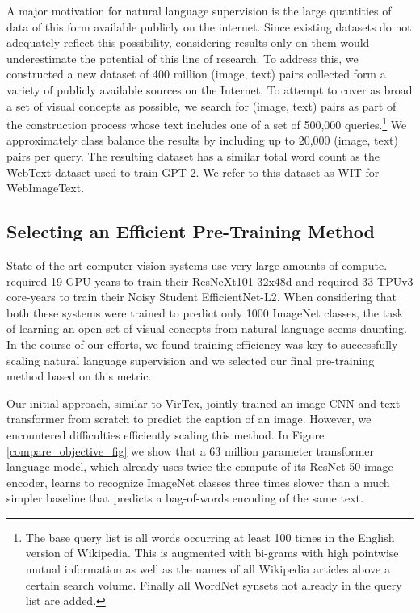 A major motivation for natural language supervision is the large quantities of data of this form available publicly on the internet. Since existing datasets do not adequately reflect this possibility, considering results only on them would underestimate the potential of this line of research. To address this, we constructed a new dataset of 400 million (image, text) pairs collected form a variety of publicly available sources on the Internet. To attempt to cover as broad a set of visual concepts as possible, we search for (image, text) pairs as part of the construction process whose text includes one of a set of 500,000 queries.\footnote{The base query list is all words occurring at least 100 times in the English version of Wikipedia. This is augmented with bi-grams with high pointwise mutual information as well as the names of all Wikipedia articles above a certain search volume. Finally all WordNet synsets not already in the query list are added.} We approximately class balance the results by including up to 20,000 (image, text) pairs per query. The resulting dataset has a similar total word count as the WebText dataset used to train GPT-2. We refer to this dataset as WIT for WebImageText.

\subsection{Selecting an Efficient Pre-Training Method}
\label{subsection:method}

State-of-the-art computer vision systems use very large amounts of compute. \citet{mahajan2018exploring} required 19 GPU years to train their ResNeXt101-32x48d and \citet{xie2020self} required 33 TPUv3 core-years to train their Noisy Student EfficientNet-L2. When considering that both these systems were trained to predict only 1000 ImageNet classes, the task of learning an open set of visual concepts from natural language seems daunting. In the course of our efforts, we found training efficiency was key to successfully scaling natural language supervision and we selected our final pre-training method based on this metric.

Our initial approach, similar to VirTex, jointly trained an image CNN and text transformer from scratch to predict the caption of an image. However, we encountered difficulties efficiently scaling this method. In Figure \ref{compare_objective_fig} we show that a 63 million parameter transformer language model, which already uses twice the compute of its ResNet-50 image encoder, learns to recognize ImageNet classes three times slower than a much simpler baseline that predicts a bag-of-words encoding of the same text.

